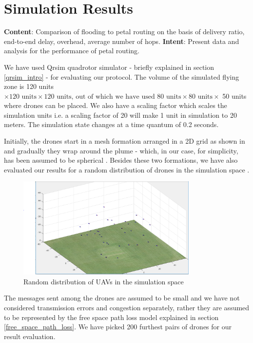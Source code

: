\chapter{Simulation Results}
\textbf{Content}: Comparison of flooding to petal routing on the basis of delivery ratio, end-to-end delay, overhead, average number of hops. 
\textbf{Intent}:  Present data and analysis for the performance of petal routing.

We have used Qrsim quadrotor simulator \cite{denardi2013rn} - briefly explained in section \ref{qrsim_intro} - for evaluating our protocol. The volume of the simulated flying zone is 120 units $ \times \text{120 units} \times \text{120 units, out of which we have used 80 units} \times \text{80 units}\times $ 50 units where drones can be placed. We also have a scaling factor which scales the simulation units i.e. a scaling factor of 20 will make 1 unit in simulation to 20 meters. The simulation state changes at a time quantum of 0.2 seconds.

Initially, the drones start in a mesh formation arranged in a 2D grid as shown in  and gradually they wrap around the plume - which, in our case, for simplicity, has been assumed to be spherical . Besides these two formations, we have also evaluated our results for a random distribution of drones in the simulation space .

\begin{figure}[hbtp]
\centering
\includegraphics[width=0.8\textwidth]{ncsuthesis-0.6/Chapter-5/figs/random_drone_locations}
\caption{Random distribution of UAVs in the simulation space}
\label{fig:random_formation}
\end{figure}

The messages sent among the drones are assumed to be small and we have not considered transmission errors and congestion separately, rather they are assumed to be represented by the free space path loss model explained in section \ref{free_space_path_loss}. We have picked 200 furthest pairs of drones for our result evaluation. 


